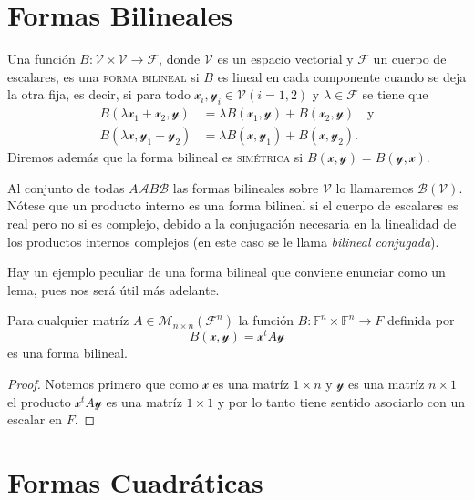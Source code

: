 \documentclass[twocolumn]{notasdeclase}
\newcommand{\ve}[1]{\mathscr{#1}}
\newcommand{\vcsp}[1]{\mathcal{#1}}
\newcommand{\V}{\mathcal{V}}
\newcommand{\F}{\mathcal{F}}
\newcommand{\Mn}[1]{\vcsp M_{n\t n}(\vcsp #1^n)}
\renewcommand{\t}{\times}
\newcommand{\Fn}{\mathbb{F}^n}
\begin{document}
\section{Formas Bilineales}

\begin{defi}
	Una función $B:\V\t\V\to\F$, donde $\V$ es un espacio vectorial y $\F$ un cuerpo de escalares, es una \textup{\textsf{\textsc{forma bilineal}}} si $B$ es lineal en cada componente cuando se deja la otra fija, es decir, si para todo $\ve x_i,\ve y_i\in\V (i=1,2)$ y $\lambda\in\F$ se tiene que
	\begin{align*}
		B(\lambda \ve x_1+\ve x_2,\ve y) &= \lambda B(\ve x_1,\ve y) + B(\ve x_2,\ve y) \quad\text{y} \\
		B(\lambda \ve x, \ve y_1 + \ve y_2) &= \lambda B(\ve x,\ve y_1) + B(\ve x,\ve y_2).
	\end{align*}
	Diremos además que la forma bilineal es \textup{\textsc{simétrica}} si $B(\ve x,\ve y) = B(\ve y,\ve x)$.
\end{defi}

Al conjunto de todas $A\mathcal{A}B\mathcal{B}$ las formas bilineales sobre $\V$ lo llamaremos $\vcsp B(\V)$. Nótese que un producto interno es una forma bilineal si el cuerpo de escalares es real pero no si es complejo, debido a la conjugación necesaria en la linealidad de los productos internos complejos (en este caso se le llama \emph{bilineal conjugada}).

Hay un ejemplo peculiar de una forma bilineal que conviene enunciar como un lema, pues nos será útil más adelante.

\begin{lem}
	Para cualquier matríz $A\in\Mn F$ la función $B:\Fn\t\Fn\to F$ definida por
	\[ B(\ve x,\ve y) = \ve x^tA\ve y \]
	es una forma bilineal.
\end{lem}
\begin{proof}
	Notemos primero que como $\ve x$ es una matríz $1\t n$ y $\ve y$ es una matríz $n\t 1$ el producto $\ve x^tA\ve y$ es una matríz $1\t 1$ y por lo tanto tiene sentido asociarlo con un escalar en $F$.
\end{proof}

\section{Formas Cuadráticas}
\end{document}

